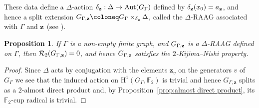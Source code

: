 \documentclass{amsart}
\newtheorem{prop}[thm]{Proposition}
\theoremstyle{definition}
\theoremstyle{remark}
\newcommand{\FF}{\mathbb{F}}
\newcommand{\calR}{\mathcal{R}}
\newcommand{\rmH}{\mathrm H}%
\newcommand{\F}{\FF}
\begin{document}
These data define a $\Delta$-action $\delta_{\bf z}:\Delta\to \operatorname{Aut}(G_\Gamma)$ defined by $\delta_{\bf z}(x_0)=a_{\bf z}$, and hence a split extension $G_{\Gamma,\bf z}\coloneq G_\Gamma\rtimes_{\delta_{\bf z}}\Delta$, called the $\Delta$-RAAG associated with $\Gamma$ and $\bf z$ (see \cite{deltaRAAGs}).

\begin{prop}
\label{prop:D-RAAGs have KN}
    If $\Gamma$ is a non-empty finite graph, and $G_{\Gamma,\bf z}$ is a $\Delta$-RAAG defined on $\Gamma$, then $\calR_2(G_{\Gamma,\bf z})=0$, and hence $G_{\Gamma,\bf z}$ satisfies the $2$-Kijima--Nishi property.
\end{prop}
\begin{proof}
{%
Since $\Delta$ acts by conjugation with the elements $\mathbf{z}_v$ on the generators $v$ of $G_\Gamma$ we see that the induced action on $\rmH^1(G_\Gamma,\FF_2)$ is trivial and hence $G_{\Gamma,\mathbf{z}}$ splits as a $2$-almost direct product and, by Proposition~\ref{prop:almost direct product}, its $\FF_2$-cup radical is trivial.}
\end{proof}
\end{document}
